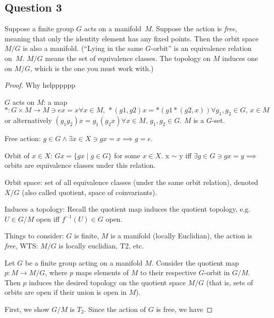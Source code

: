 \subsection{Question 3}
\begin{prob} 
        Suppose a finite group $G$ acts on a manifold~$M$.  Suppose
    the action is \textit{free}, meaning that only the identity
    element has any fixed points.  Then the orbit space $M/G$ is
    also a manifold.  (``Lying in the same $G$-orbit'' is an
    equivalence relation on~$M$.  $M/G$ means the set of equivalence
    classes.  The topology on $M$ induces one on $M/G$, which
    is the one you must work with.)
\end{prob}
\begin{proof}
    Why helpppppp

    $G$ acts on $M$: a map $*:G \times M \to M \ni ex=x \forall x \in M, \, *(g1,g2)x=*(g1*(g2,x)) \forall g_1,g_2 \in G, \, x \in M$ or alternatively $(g_1g_2)x=g_1(g_2x) \forall x \in M, \, g_1, g_2 \in G.$ $M$ is a $G$-set. 

    Free action: $g \in G \land \exists x \in X \ni gx=x \implies g=e.$

    Orbit of $x \in X$: $Gx = \{ gx \mid g \in G \}$ for some $x \in X$. x $\sim$ y iff $\exists g \in G \ni gx=y \implies$ orbits are equivalence classes under this relation. 

    Orbit space: set of all equivalence classes (under the same orbit relation), denoted $X/G$ (also called quotient, space of coinvariants).

    Induces a topology: Recall the quotient map induces the quotient topology, e.g. $U \in G/M$ open iff $f^{-1}(U) \in G$ open.

    Things to consider: $G$ is finite, $M$ is a manifold (locally Euclidian), the action is  \textit{free}, WTS: $M/G$ is locally euclidian, T2, etc.
    \vspace{5mm}

    Let $G$ be a finite group acting on a manifold $M$. Consider the quotient map $p:M \to M/G$, where $p$ maps elements of $M$ to their respective $G$-orbit in $G/M$. Then $p$ induces the desired topology on the quotient space $M/G$ (that is, sets of orbits are open if their union is open in $M$). 

    First, we show $G/M$ is $T_2$.
    Since the action of $G$ is free, we have
\end{proof}


